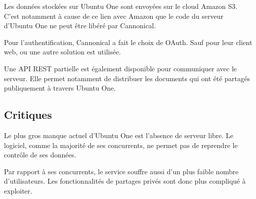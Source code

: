 Les données stockées sur Ubuntu One sont envoyées sur le cloud Amazon S3. C'est notamment à cause de ce lien avec Amazon que le code du serveur d'Ubuntu One ne peut être libéré par Cannonical.

Pour l'authentification, Cannonical a fait le choix de OAuth. Sauf pour leur client web, ou une autre solution est utilisée.

Une API REST partielle est également disponible pour communiquer avec le serveur. Elle permet notamment de distribuer les documents qui ont été partagés publiquement à travers Ubuntu One.

\subsection{Critiques}
Le plus gros manque actuel d'Ubuntu One est l'absence de serveur libre. Le logiciel, comme la majorité de ses concurrents, ne permet pas de reprendre le contrôle de ses données.

Par rapport à ses concurrents, le service souffre aussi d'un plus faible nombre d'utilisateurs. Les fonctionnalités de partages privés sont donc plus compliqué à exploiter.
